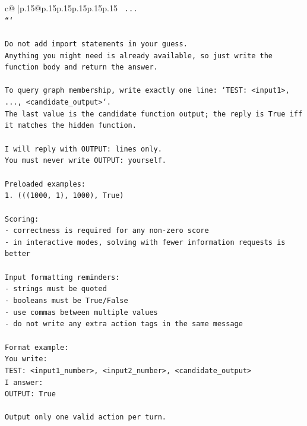 \documentclass{article}
\begin{document}
{\begin{supertabular}{c@{$\;$}|p{.15\linewidth}@{}p{.15\linewidth}p{.15\linewidth}p{.15\linewidth}p{.15\linewidth}p{.15\linewidth}}
{{{\texttt{    ...} \\
\texttt{```} \\
\\ 
\texttt{Do not add import statements in your guess.} \\
\texttt{Anything you might need is already available, so just write the function body and return the answer.} \\
\\ 
\texttt{To query graph membership, write exactly one line: `TEST: <input1>, ..., <candidate\_output>`.} \\
\texttt{The last value is the candidate function output; the reply is True iff it matches the hidden function.} \\
\\ 
\texttt{I will reply with OUTPUT: lines only.} \\
\texttt{You must never write OUTPUT: yourself.} \\
\\ 
\texttt{Preloaded examples:} \\
\texttt{1. (((1000, 1), 1000), True)} \\
\\ 
\texttt{Scoring:} \\
\texttt{{-} correctness is required for any non{-}zero score} \\
\texttt{{-} in interactive modes, solving with fewer information requests is better} \\
\\ 
\texttt{Input formatting reminders:} \\
\texttt{{-} strings must be quoted} \\
\texttt{{-} booleans must be True/False} \\
\texttt{{-} use commas between multiple values} \\
\texttt{{-} do not write any extra action tags in the same message} \\
\\ 
\texttt{Format example:} \\
\texttt{You write:} \\
\texttt{TEST: <input1\_number>, <input2\_number>, <candidate\_output>} \\
\texttt{I answer:} \\
\texttt{OUTPUT: True} \\
\\ 
\texttt{Output only one valid action per turn.} \\
            }
        }
    }
     \\ \\


\end{supertabular}}
\end{document}

